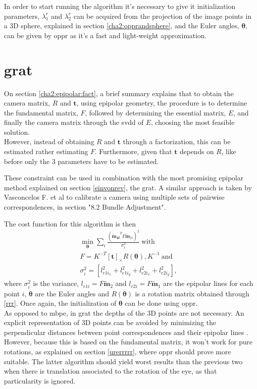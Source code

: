 In order to start running the algorithm it's necessary to give it initialization parameters, $\lambda_{1}^r$ and $\lambda_{2}^r$ can be acquired from the projection of the image points in a 3D sphere, explained in section \ref{cha2:opprandsphere}, and the Euler angles, $\mathbf{\theta}$, can be given by \acrlong{oppr} as it's a fast and light-weight approximation.

\section{\acrlong{grat}}
On section \ref{cha2:epipolar:fact}, a brief summary explains that to obtain the camera matrix, $R$ and $\mathbf{t}$, using epipolar geometry, the procedure is to determine the fundamental matrix, $F$, followed by determining the essential matrix, $E$, and finally the camera matrix through the \acrshort{svdd} of $E$, choosing the most feasible solution.\\
However, instead of obtaining $R$ and $\mathbf{t}$ through a factorization, this can be estimated rather estimating $F$. Furthermore, given that $\mathbf{t}$ depends on $R$, like before only the 3 parameters have to be estimated. 

These constraint can be used in combination with the most promising epipolar method explained on section \ref{einvonrev}, the \acrlong{grat}. A similar approach is taken by Vasconcelos F. et al \cite{vasconcelos}
to calibrate a camera using multiple sets of pairwise correspondences, in section "8.2 Bundle Adjustment". 

The cost function for this algorithm is then
\begin{align}
\min_\mathbf{\theta} \sum_i \frac{ (\mathbf{\widetilde{\mathbf{m}}_{2i}}^T F \widetilde{\mathbf{m}}_{1i})^2}{\sigma_i^2} \ \text{with}\\
F = K^{-T} [\mathbf{t}]_\times R(\mathbf{ \theta}), K^{-1} \ \text{and}\\
\label{dopewnrvno}
\sigma_i^2 =  [l_{{e1i}_x}^2 + l_{{e1i}_y}^2 + l_{{e2i}_x}^2 + l_{{e2i}_y}^2],
\end{align}
where $\sigma_i^2$ is the variance, $l_{e1i} = F\widetilde{\mathbf{m}}_{2}$ and $l_{e2i} = F\widetilde{\mathbf{m}}_{1}$ are the epipolar lines for each point $i$, $\mathbf{\theta}$ are the Euler angles and $R(\mathbf{ \theta})$ is a rotation matrix obtained through \ref{rrr}. Once again, the initialization of $\mathbf{ \theta}$ can be done using \acrlong{oppr}.\\

As opposed to \acrshort{mbpe}, in \acrshort{grat} the depths of the 3D points are not necessary. An explicit representation of 3D points can be avoided by minimizing the perpendicular distances between point correspondences and their epipolar lines \cite{vasconcelos} \cite{bundle}.
However, because this is based on the fundamental matrix, it won't work for pure rotations, as explained on section \ref{urerrrrr}, where \acrshort{oppr} should prove more suitable. The latter algorithm should yield worst results than the previous two when there is translation associated to the rotation of the eye, as that particularity is ignored.

